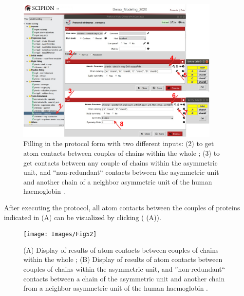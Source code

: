 \begin{itemize}
  \begin{figure}[H]
            \centering 
            \captionsetup{width=.9\linewidth} 
            \includegraphics[width=0.9\textwidth]{Images/Fig50}
            \caption{Filling in the  protocol form with two different inputs: (2) to get atom contacts between couples of chains within the whole ; (3) to get contacts between any couple of chains within the asymmetric unit, and ``non-redundant`` contacts between the asymmetric unit and another chain of a neighbor asymmetric unit of the human haemoglobin .}
            \label{fig:contacts_unit cell}
        \end{figure}
        
After executing the protocol, all atom contacts between the couples of proteins indicated in  (A) can be visualized by clicking  ( (A)).
 
 \begin{figure}[H]
            \centering 
            \captionsetup{width=.9\linewidth} 
            \texttt{[image: Images/Fig52]}
            \caption{(A) Display of results of atom contacts between couples of chains within the whole ; (B) Display of results of atom contacts between couples of chains within the asymmetric unit, and ''non-redundant`` contacts between a chain of the asymmetric unit and another chain from a neighbor asymmetric unit of the human haemoglobin .}
            \label{fig:contacts_results}
        \end{figure}


\end{itemize}
